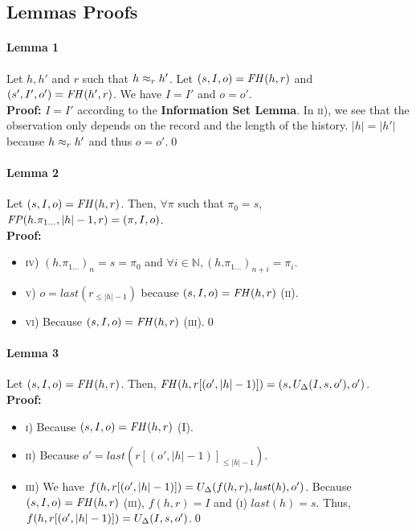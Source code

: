 \subsection{Lemmas Proofs}
\label{subsec:lemmaproof}

\paragraph{Lemma 1}
Let $h,h'$ and $r$ such that $h\approx_{r}h'$. Let $(s,I,o)=\mathit{FH}(h,r)$ and $(s',I',o')=\mathit{FH}(h',r)$. We have $I=I'$ and $o=o'$.\\
\textbf{Proof:} $I=I'$ according to the \textbf{Information Set Lemma}. In \textsc{ii)}, we see that the observation only depends on the record and the length of the history. $|h|=|h'|$ because $h\approx_{r}h'$ and thus $o=o'$.\qed

\paragraph{Lemma 2}
Let $(s,I,o)=\mathit{FH}(h,r)$. Then, $\forall\pi$ such that $\pi_0=s$, $\mathit{FP}(h.\pi_{1\dots},|h|-1,r)=(\pi,I,o)$.\\
\textbf{Proof:} \begin{itemize}
\item\textsc{iv)} $(h.\pi_{1\dots})_n=s=\pi_0$ and $\forall i\in\mathbb{N}, (h.\pi_{1\dots})_{n+i}=\pi_i$.
\item\textsc{v)} $o=\mathit{last}(r_{\leq |h|-1})$ because $(s,I,o)=\mathit{FH}(h,r)$ (\textsc{ii}).
\item\textsc{vi)} Because $(s,I,o)=\mathit{FH}(h,r)$ (\textsc{iii}).\qed
\end{itemize}

\paragraph{Lemma 3}
Let $(s,I,o)=\mathit{FH}(h,r)$. Then, $\mathit{FH}(h,r[(o',|h|-1)])=(s,U_{\Delta}(I,s,o'),o')$.\\
\textbf{Proof:} \begin{itemize}
\item\textsc{i)} Because $(s,I,o)=\mathit{FH}(h,r)$ (\textsc{I}).
\item\textsc{ii)} Because $o'=\mathit{last}(r[(o',|h|-1)]_{\leq |h|-1})$.
\item\textsc{iii)} We have $f(h,r[(o',|h|-1)])=U_{\Delta}(f(h,r),\mathit{last(h)},o')$. Because $(s,I,o)=\mathit{FH}(h,r)$ (\textsc{iii}), $f(h,r)=I$ and (\textsc{i}) $\mathit{last}(h)=s$. Thus, $f(h,r[(o',|h|-1)])=U_{\Delta}(I,s,o')$.\qed
\end{itemize}

